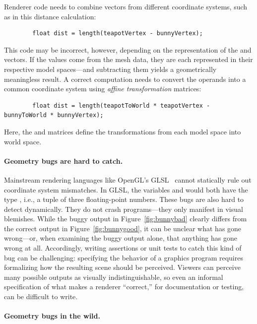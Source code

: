 \documentclass[../main.tex]{subfiles}
\begin{document}
	Renderer code needs to combine vectors from different coordinate systems, such as in this distance calculation:
	\begin{lstlisting}
		float dist = length(teapotVertex - bunnyVertex);
	\end{lstlisting}
	This code may be incorrect, however, depending on the representation of the  and  vectors.
	If the values come from the mesh data, they are each represented in their respective model spaces---and subtracting them yields a geometrically meaningless result.
	A correct computation needs to convert the operands into a common coordinate system using \emph{affine transformation} matrices:
	\begin{lstlisting}
		float dist = length(teapotToWorld * teapotVertex - bunnyToWorld * bunnyVertex);
	\end{lstlisting}
	Here, the  and  matrices define the transformations from each model space into world space.
	
	\paragraph{Geometry bugs are hard to catch.}
	
	Mainstream rendering languages like OpenGL's GLSL~\cite{opengl} cannot statically rule out coordinate system mismatches.
	In GLSL, the variables  and  would both have the type , i.e., a tuple of three floating-point numbers.
	These bugs are also hard to detect dynamically.
	They do not crash programs---they only manifest in visual blemishes.
	While the buggy output in Figure~\ref{fig:bunnybad} clearly differs from the correct output in Figure~\ref{fig:bunnygood}, it can be unclear what has gone wrong---or, when examining the buggy output alone, that anything has gone wrong at all.
	Accordingly, writing assertions or unit tests to catch this kind of bug can be challenging: specifying the behavior of a graphics program requires formalizing how the resulting scene should be perceived.
	Viewers can perceive many possible outputs as visually indistinguishable, so even an informal specification of what makes a renderer ``correct,'' for documentation or testing, can be difficult to write.
	
	\paragraph{Geometry bugs in the wild.}
	
\end{document}

